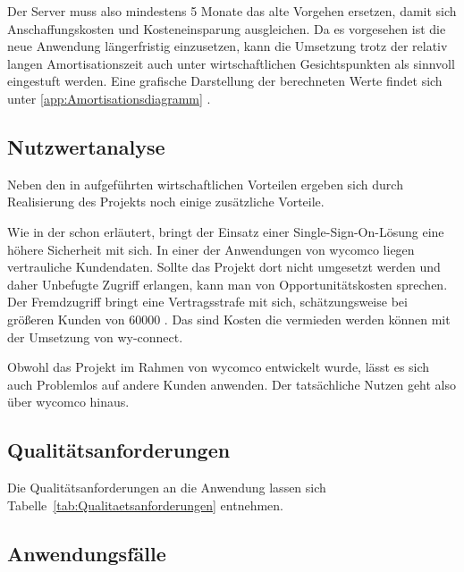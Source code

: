 Der Server muss also mindestens 5 Monate das alte Vorgehen ersetzen,
damit sich Anschaffungskosten und Kosteneinsparung ausgleichen. Da es vorgesehen ist die
neue Anwendung längerfristig einzusetzen, kann die Umsetzung trotz der relativ langen
Amortisationszeit auch unter wirtschaftlichen Gesichtspunkten als sinnvoll eingestuft werden.
Eine grafische Darstellung der berechneten Werte findet sich unter \ref{app:Amortisationsdiagramm} .


\subsection{Nutzwertanalyse}
\label{sec:Nutzwertanalyse}

Neben den in  aufgeführten wirtschaftlichen Vorteilen ergeben sich durch Realisierung des Projekts noch einige zusätzliche Vorteile.

Wie in der  schon erläutert, bringt der Einsatz einer Single-Sign-On-Lösung eine höhere Sicherheit mit sich.
In einer der Anwendungen von wycomco liegen vertrauliche Kundendaten. Sollte das Projekt dort nicht umgesetzt werden und daher Unbefugte Zugriff erlangen, kann man von Opportunitätskosten sprechen. Der Fremdzugriff bringt eine Vertragsstrafe mit sich, schätzungsweise bei größeren Kunden von 60000 \eur. Das sind Kosten die vermieden werden können mit der Umsetzung von wy-connect. 

Obwohl das Projekt im Rahmen von wycomco entwickelt wurde, lässt es sich auch Problemlos auf andere Kunden anwenden. Der tatsächliche Nutzen geht also über wycomco hinaus.


\subsection{Qualitätsanforderungen}
\label{sec:Qualitaetsanforderungen}

Die Qualitätsanforderungen an die Anwendung lassen sich Tabelle~\ref{tab:Qualitaetsanforderungen} entnehmen.


\subsection{Anwendungsfälle}
\label{sec:Anwendungsfaelle}

